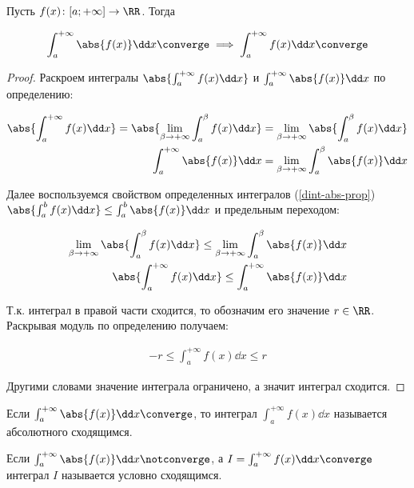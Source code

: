 
\begin{theorem}
  Пусть \(f(x) \colon [a; +\infty] \to \RR\). Тогда

  \begin{align*}
    \int_{a}^{+\infty} \abs{f(x)} \dd x \converge
    \implies \int_{a}^{+\infty} f(x) \dd x \converge
  \end{align*}
\end{theorem}
\begin{proof}
  Раскроем интегралы
  \(\abs{\int_{a}^{+\infty} f(x) \dd x}\)
  и
  \(\int_{a}^{+\infty} \abs{f(x)} \dd x\)
  по определению:

  \begin{align*}
    \abs{\int_{a}^{+\infty} f(x) \dd x}
    = \abs{\lim_{\beta \to +\infty} \int_{a}^{\beta} f(x) \dd x}
    = \lim_{\beta \to +\infty} \abs{\int_{a}^{\beta} f(x) \dd x}
    \\
    \int_{a}^{+\infty} \abs{f(x)} \dd x
    = \lim_{\beta \to +\infty} \int_{a}^{\beta} \abs{f(x)} \dd x
  \end{align*}

  Далее воспользуемся свойством определенных интегралов (\ref{dint-abs-prop})
  \(\abs{\int_{a}^{b} f(x) \dd x} \le \int_{a}^{b} \abs{f(x)} \dd x\) и
  предельным переходом:

  \begin{align*}
    \lim_{\beta \to +\infty} \abs{\int_{a}^{\beta} f(x) \dd x}
    \le
    \lim_{\beta \to +\infty} \int_{a}^{\beta} \abs{f(x)} \dd x
    \\
    \abs{\int_{a}^{+\infty} f(x) \dd x} \le \int_{a}^{+\infty} \abs{f(x)} \dd x
  \end{align*}

  Т.к. интеграл в правой части сходится, то обозначим его значение
  \(r \in \RR\). Раскрывая модуль по определению получаем:

  \begin{align*}
    -r \le \int_{a}^{+\infty} f(x) \dd x \le r
  \end{align*}

  Другими словами значение интеграла ограничено, а значит интеграл сходится.
\end{proof}

\begin{definition}
  Если \(\int_{a}^{+\infty} \abs{f(x)} \dd x \converge\), то интеграл
  \(\int_{a}^{+\infty} f(x) \dd x\) называется абсолютного сходящимся.
\end{definition}

\begin{definition}
  Если \(\int_{a}^{+\infty} \abs{f(x)} \dd x \notconverge\), а
  \(I = \int_{a}^{+\infty} f(x) \dd x \converge\) интеграл \(I\) называется
  условно сходящимся.
\end{definition}


